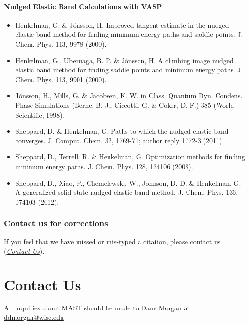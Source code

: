 \documentclass[letterpaper,10pt,english]{sphinxmanual}
\begin{document}
\subsubsection{Nudged Elastic Band Calculations with VASP}
\label{15_0_citations:nudged-elastic-band-calculations-with-vasp}\begin{itemize}
\item {} 
Henkelman, G. \& Jónsson, H. Improved tangent estimate in the nudged elastic band method for finding minimum energy paths and saddle points. J. Chem. Phys. 113, 9978 (2000).

\item {} 
Henkelman, G., Uberuaga, B. P. \& Jónsson, H. A climbing image nudged elastic band method for finding saddle points and minimum energy paths. J. Chem. Phys. 113, 9901 (2000).

\item {} 
Jónsson, H., Mills, G. \& Jacobsen, K. W. in Class. Quantum Dyn. Condens. Phase Simulations (Berne, B. J., Ciccotti, G. \& Coker, D. F.) 385 (World Scientific, 1998).

\item {} 
Sheppard, D. \& Henkelman, G. Paths to which the nudged elastic band converges. J. Comput. Chem. 32, 1769-71; author reply 1772-3 (2011).

\item {} 
Sheppard, D., Terrell, R. \& Henkelman, G. Optimization methods for finding minimum energy paths. J. Chem. Phys. 128, 134106 (2008).

\item {} 
Sheppard, D., Xiao, P., Chemelewski, W., Johnson, D. D. \& Henkelman, G. A generalized solid-state nudged elastic band method. J. Chem. Phys. 136, 074103 (2012).

\end{itemize}


\subsection{Contact us for corrections}
\label{15_0_citations:contact-us-for-corrections}
If you feel that we have missed or mis-typed a citation, please contact us ({\hyperref[14_0_contact::doc]{\emph{Contact Us}}}).


\chapter{Contact Us}
\label{14_0_contact:contact-us}\label{14_0_contact::doc}
All inquiries about MAST should be made to Dane Morgan at \href{mailto:ddmorgan@wisc.edu}{ddmorgan@wisc.edu}
\end{document}
